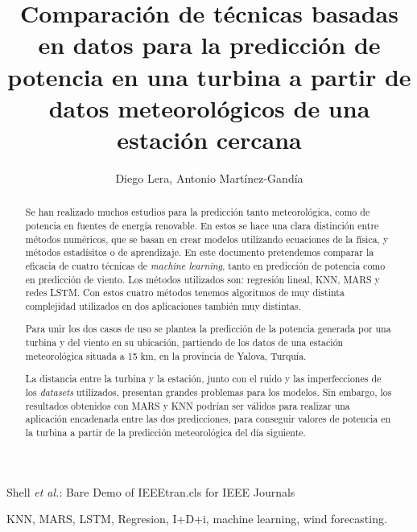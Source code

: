 \documentclass[journal]{IEEEtran}
\begin{document}
\title{Comparación de técnicas basadas en datos para la predicción de potencia en una turbina a partir de datos meteorológicos de una estación cercana}

\author{Diego Lera, Antonio Martínez-Gandía}%

%
{Shell \MakeLowercase{\textit{et al.}}: Bare Demo of IEEEtran.cls for IEEE Journals}

\maketitle

\begin{abstract}
Se han realizado muchos estudios para la predicción tanto meteorológica, como de potencia en fuentes de energía renovable. En estos se hace una clara distinción entre métodos numéricos, que se basan en crear modelos utilizando ecuaciones de la física, y métodos estadísitos o de aprendizaje. En este documento pretendemos comparar la eficacia de cuatro técnicas de \emph{machine learning}, tanto en predicción de potencia como en predicción de viento.
Los métodos utilizados son: regresión lineal, KNN, MARS y redes LSTM. Con estos cuatro métodos tenemos algoritmos de muy distinta complejidad utilizados en dos aplicaciones también muy distintas.

Para unir los dos casos de uso se plantea la predicción de la potencia generada por una turbina y del viento en su ubicación, partiendo de los datos de una estación meteorológica situada a 15 km, en la provincia de Yalova, Turquía.

La distancia entre la turbina y la estación, junto con el ruido y las imperfecciones de los \emph{datasets} utilizados, presentan grandes problemas para los modelos. Sin embargo, los resultados obtenidos con MARS y KNN podrían ser válidos para realizar una aplicación encadenada entre las dos predicciones, para conseguir valores de potencia en la turbina a partir de la predicción meteorológica del día siguiente.
\end{abstract}

\begin{IEEEkeywords}
KNN, MARS, LSTM, Regresion, I+D+i, machine learning, wind forecasting.
\end{IEEEkeywords}
\end{document}
